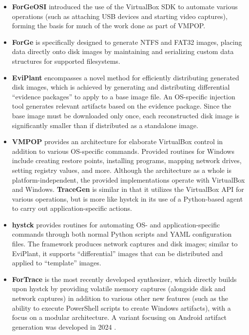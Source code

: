 \documentclass[preprint,12pt]{elsarticle}
\begin{document}
\begin{itemize}
\item
  \textbf{ForGeOSI} \citep{maxfraggMaxfraggForGeOSI2023} introduced
  the use of the VirtualBox SDK to automate various operations (such as
  attaching USB devices and starting video captures), forming the basis
  for much of the work done as part of VMPOP.
\item
  \textbf{ForGe} \citep{vistiAutomaticCreationComputer2015} is
  specifically designed to generate NTFS and FAT32 images, placing data
  directly onto disk images by maintaining and serializing custom data
  structures for supported filesystems.
\item
  \textbf{EviPlant} \citep{scanlonEviPlantEfficientDigital2017}
  encompasses a novel method for efficiently distributing generated disk
  images, which is achieved by generating and distributing differential
  ``evidence packages'' to apply to a base image file. An OS-specific
  injection tool generates relevant artifacts based on the evidence
  package. Since the base image must be downloaded only once, each
  reconstructed disk image is significantly smaller than if distributed
  as a standalone image.
\item
  \textbf{VMPOP} \citep{parkTREDEVMPOPCultivating2018} provides an
  architecture for elaborate VirtualBox control in addition to various
  OS-specific commands. Provided routines for Windows include creating
  restore points, installing programs, mapping network drives, setting
  registry values, and more. Although the architecture as a whole is
  platform-independent, the provided implementations operate with
  VirtualBox and Windows. \textbf{TraceGen}
  \citep{duTraceGenUserActivity2021} is similar in that it utilizes
  the VirtualBox API for various operations, but is more like hystck in
  its use of a Python-based agent to carry out application-specific
  actions.
\item
  \textbf{hystck} \citep{gobelNovelApproachGenerating2020} provides
  routines for automating OS- and application-specific commands through
  both normal Python scripts and YAML configuration files. The framework
  produces network captures and disk images; similar to EviPlant, it
  supports ``differential'' images that can be distributed and applied
  to ``template'' images.
\item
  \textbf{ForTrace} \citep{gobelForTraceHolisticForensic2022} is the
  most recently developed synthesizer, which directly builds upon hystck
  by providing volatile memory captures (alongside disk and network
  captures) in addition to various other new features (such as the
  ability to execute PowerShell scripts to create Windows artifacts),
  with a focus on a modular architecture. A variant focusing on Android
  artifact generation was developed in 2024
  \citep{demmelDataSynthesisGoing2024}.
\end{itemize}
\end{document}
